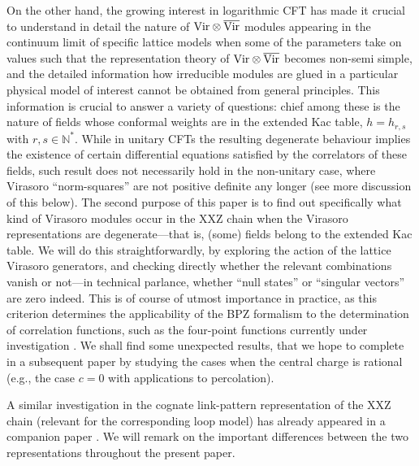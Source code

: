 \documentclass[a4paper,10pt]{article}
\newcommand{\linnea}[1]{$\framebox{\tiny L}$\ \textbf{\texttt{{\color{red}\footnotesize#1}}}}
\newcommand{\VirN}{\hbox{Vir}\otimes\overline{\hbox{Vir}}}
\begin{document}
On the other hand, the growing interest in logarithmic CFT has made it crucial to understand in detail the nature of $\VirN$ modules appearing in the continuum limit of specific lattice models when some of the parameters take on values such that the representation theory of $\VirN$ becomes non-semi simple, and the detailed information how irreducible modules are glued in a particular physical model of interest cannot be obtained from general principles. This information is crucial to answer a variety of questions: chief among these is the nature of fields whose conformal weights are in the extended Kac table, $h=h_{r,s}$ with $r,s\in\mathbb{N}^*$. While in unitary CFTs the resulting degenerate behaviour implies the existence of certain differential equations satisfied by the correlators of these fields, such result does not necessarily hold in the non-unitary case, where Virasoro ``norm-squares'' are not positive definite any longer (see more discussion of this below). 
The second purpose of this paper is to 
find out specifically what kind of Virasoro modules occur in the  XXZ chain %
when the Virasoro representations are degenerate---that is, (some) fields belong to the extended Kac table.   We will do this straightforwardly, by exploring the action of the lattice Virasoro generators, and checking directly whether the relevant combinations vanish or not---in technical parlance, whether ``null states'' or ``singular vectors''  are zero indeed. This is of course of utmost importance in practice, as this criterion determines the applicability of the BPZ formalism \cite{BPZ} to the determination of correlation functions, such as the four-point functions currently under investigation \cite{JacobsenSaleur,HeGransJacobsenSaleur,HeJacobsenSaleur}. We shall find some unexpected results, that we hope to complete in a subsequent paper \cite{fullynongenericpaper} by studying the cases when the central charge is rational (e.g., the case $c=0$ with applications to percolation).

A similar investigation in the cognate link-pattern representation of the XXZ chain (relevant for the corresponding loop model) has already appeared in a companion paper \cite{LoopPaper}. We will remark on the important differences between the two representations throughout the present paper.
\end{document}
